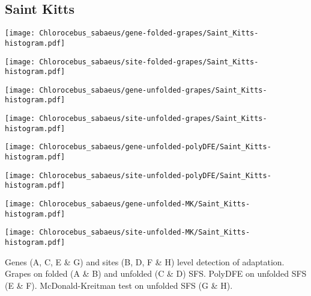 \documentclass{article}
\begin{document}
\pagebreak
\subsection{Saint Kitts}
\centering
\begin{minipage}{0.49\linewidth}
    \texttt{[image: Chlorocebus\_sabaeus/gene-folded-grapes/Saint\_Kitts-histogram.pdf]}
\end{minipage}%
\hfill
\begin{minipage}{0.49\linewidth}
    \texttt{[image: Chlorocebus\_sabaeus/site-folded-grapes/Saint\_Kitts-histogram.pdf]}
\end{minipage}
\hfill
\begin{minipage}{0.49\linewidth}
    \texttt{[image: Chlorocebus\_sabaeus/gene-unfolded-grapes/Saint\_Kitts-histogram.pdf]}
\end{minipage}%
\hfill
\begin{minipage}{0.49\linewidth}
    \texttt{[image: Chlorocebus\_sabaeus/site-unfolded-grapes/Saint\_Kitts-histogram.pdf]}
\end{minipage}
\hfill
\begin{minipage}{0.49\linewidth}
    \texttt{[image: Chlorocebus\_sabaeus/gene-unfolded-polyDFE/Saint\_Kitts-histogram.pdf]}
\end{minipage}%
\hfill
\begin{minipage}{0.49\linewidth}
    \texttt{[image: Chlorocebus\_sabaeus/site-unfolded-polyDFE/Saint\_Kitts-histogram.pdf]}
\end{minipage}
\hfill
\begin{minipage}{0.49\linewidth}
    \texttt{[image: Chlorocebus\_sabaeus/gene-unfolded-MK/Saint\_Kitts-histogram.pdf]}
\end{minipage}%
\hfill
\begin{minipage}{0.49\linewidth}
    \texttt{[image: Chlorocebus\_sabaeus/site-unfolded-MK/Saint\_Kitts-histogram.pdf]}
\end{minipage}
\hfill
\flushleft
Genes (A, C, E \& G) and sites (B, D, F \& H) level detection of adaptation.
Grapes on folded (A \& B) and unfolded (C \& D) SFS.
PolyDFE on unfolded SFS (E \& F).
McDonald-Kreitman test on unfolded SFS (G \& H).
\end{document}
